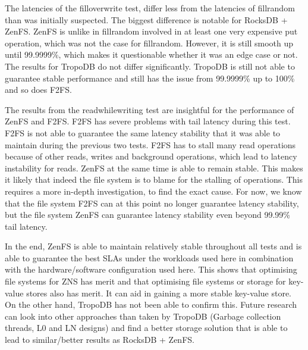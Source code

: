 The latencies of the filloverwrite test, differ less from the latencies of fillrandom than was initially suspected. The biggest difference is notable for RocksDB + ZenFS. ZenFS is unlike in fillrandom involved in at least one very expensive put operation, which was not the case for fillrandom. However, it is still smooth up until 99.9999\%, which makes it questionable whether it was an edge case or not. The results for TropoDB do not differ significantly. TropoDB is still not able to guarantee stable performance and still has the issue from 99.9999\% up to 100\% and so does F2FS. 

The results from the readwhilewriting test are insightful for the performance of ZenFS and F2FS. F2FS has severe problems with tail latency during this test. F2FS is not able to guarantee the same latency stability that it was able to maintain during the previous two tests. F2FS has to stall many read operations because of other reads, writes and background operations, which lead to latency instability for reads. ZenFS at the same time is able to remain stable. This makes it likely that indeed the file system is to blame for the stalling of operations. This requires a more in-depth investigation, to find the exact cause. For now, we know that the file system F2FS can at this point no longer guarantee latency stability, but the file system ZenFS can guarantee latency stability even beyond 99.99\% tail latency.

In the end, ZenFS is able to maintain relatively stable throughout all tests and is able to guarantee the best SLAs under the workloads used here in combination with the hardware/software configuration used here. This shows that optimising file systems for ZNS has merit and that optimising file systems or storage for key-value stores also has merit. It can aid in gaining a more stable key-value store. On the other hand, TropoDB has not been able to confirm this. Future research can look into other approaches than taken by TropoDB (Garbage collection threads, L0 and LN designs) and find a better storage solution that is able to lead to similar/better results as RocksDB + ZenFS.


